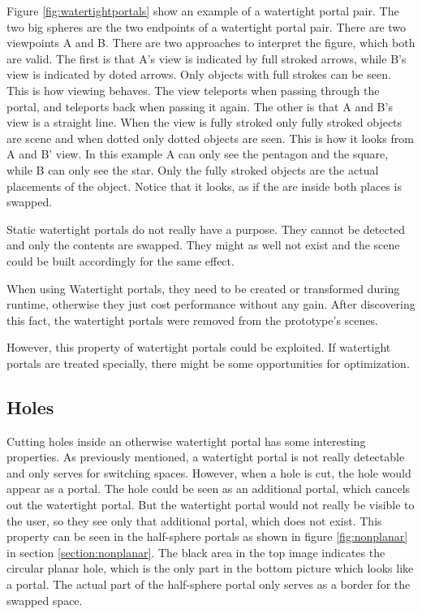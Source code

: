 Figure \ref{fig:watertightportals} show an example of a watertight portal pair. The two big spheres are the two endpoints of a watertight portal pair. There are two viewpoints A and B.
There are two approaches to interpret the figure, which both are valid.
The first is that A's view is indicated by full stroked arrows, while B's view is indicated by doted arrows. Only objects with full strokes can be seen. This is how viewing behaves. The view teleports when passing through the portal, and teleports back when passing it again.
The other is that A and B's view is a straight line. When the view is fully stroked only fully stroked objects are scene and when dotted only dotted objects are seen. This is how it looks from A and B' view.
In this example A can only see the pentagon and the square, while B can only see the star. Only the fully stroked objects are the actual placements of the object. Notice that it looks, as if the are inside both places is swapped.

Static watertight portals do not really have a purpose. They cannot be detected and only the contents are swapped. They might as well not exist and the scene could be built accordingly for the same effect.

When using Watertight portals, they need to be created or transformed during runtime, otherwise they just cost performance without any gain. After discovering this fact, the watertight portals were removed from the prototype's scenes.

However, this property of watertight portals could be exploited. If watertight portals are treated specially, there might be some opportunities for optimization.

\subsection{Holes}
Cutting holes inside an otherwise watertight portal has some interesting properties. As previously mentioned, a watertight portal is not really detectable and only serves for switching spaces. However, when a hole is cut, the hole would appear as a portal. The hole could be seen as an additional portal, which cancels out the watertight portal. But the watertight portal would not really be visible to the user, so they see only that additional portal, which does not exist. This property can be seen in the half-sphere portals as shown in figure \ref{fig:nonplanar} in section \ref{section:nonplanar}. The black area in the top image indicates the circular planar hole, which is the only part in the bottom picture which looks like a portal. The actual part of the half-sphere portal only serves as a border for the swapped space.
